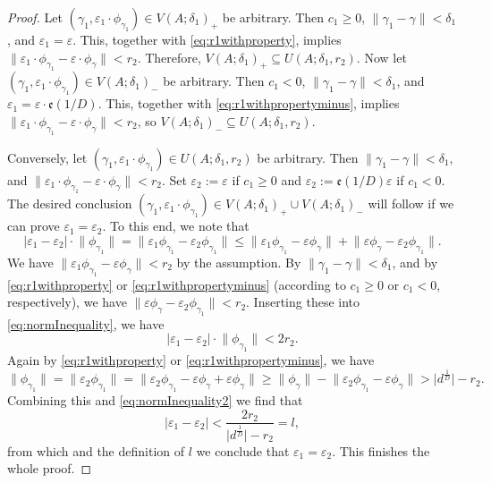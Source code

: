 \documentclass[12pt]{amsart}
\numberwithin{equation}{section}
\theoremstyle{plain}
\theoremstyle{definition}
\theoremstyle{remark}
\newcommand*\abs[1]{\lvert#1\rvert}
\newcommand\etp[1]{\mathfrak{e}\left(#1\right)}
\begin{document}
\begin{appendix}
\begin{proof}
Let $(\gamma_1,\varepsilon_1\cdot\phi_{\gamma_1})\in V(A;\delta_1)_{+}$ be arbitrary. Then $c_1\geq0$, $\lVert\gamma_1-\gamma\rVert<\delta_1$, and $\varepsilon_1=\varepsilon$. This, together with \eqref{eq:r1withproperty}, implies $\lVert\varepsilon_1\cdot\phi_{\gamma_1}-\varepsilon\cdot\phi_{\gamma}\rVert<r_2$. Therefore, $V(A;\delta_1)_{+}\subseteq U(A;\delta_1,r_2)$. Now let $(\gamma_1,\varepsilon_1\cdot\phi_{\gamma_1})\in V(A;\delta_1)_{-}$ be arbitrary. Then $c_1<0$, $\lVert\gamma_1-\gamma\rVert<\delta_1$, and $\varepsilon_1=\varepsilon\cdot\etp{1/D}$. This, together with \eqref{eq:r1withpropertyminus}, implies $\lVert\varepsilon_1\cdot\phi_{\gamma_1}-\varepsilon\cdot\phi_{\gamma}\rVert<r_2$, so $V(A;\delta_1)_{-}\subseteq U(A;\delta_1,r_2)$.

Conversely, let $(\gamma_1,\varepsilon_1\cdot\phi_{\gamma_1})\in U(A;\delta_1,r_2)$ be arbitrary. Then $\lVert\gamma_1-\gamma\rVert<\delta_1$, and $\lVert\varepsilon_1\cdot\phi_{\gamma_1}-\varepsilon\cdot\phi_{\gamma}\rVert<r_2$. Set $\varepsilon_2:=\varepsilon$ if $c_1\geq0$ and $\varepsilon_2:=\etp{1/D}\varepsilon$ if $c_1<0$. The desired conclusion $(\gamma_1,\varepsilon_1\cdot\phi_{\gamma_1})\in V(A;\delta_1)_{+}\cup V(A;\delta_1)_{-}$ will follow if we can prove $\varepsilon_1=\varepsilon_2$. To this end, we note that
\begin{equation}
\label{eq:normInequality}
\abs{\varepsilon_1-\varepsilon_2}\cdot\lVert\phi_{\gamma_1}\rVert=\lVert\varepsilon_1\phi_{\gamma_1}-\varepsilon_2\phi_{\gamma_1}\rVert\leq\lVert\varepsilon_1\phi_{\gamma_1}-\varepsilon\phi_{\gamma}\rVert+\lVert\varepsilon\phi_{\gamma}-\varepsilon_2\phi_{\gamma_1}\rVert.
\end{equation}
We have $\lVert\varepsilon_1\phi_{\gamma_1}-\varepsilon\phi_{\gamma}\rVert<r_2$ by the assumption. By $\lVert\gamma_1-\gamma\rVert<\delta_1$, and by \eqref{eq:r1withproperty} or \eqref{eq:r1withpropertyminus} (according to $c_1\geq0$ or $c_1<0$, respectively), we have $\lVert\varepsilon\phi_{\gamma}-\varepsilon_2\phi_{\gamma_1}\rVert<r_2$. Inserting these into \eqref{eq:normInequality}, we have
\begin{equation}
\label{eq:normInequality2}
\abs{\varepsilon_1-\varepsilon_2}\cdot\lVert\phi_{\gamma_1}\rVert<2r_2.
\end{equation}
Again by \eqref{eq:r1withproperty} or \eqref{eq:r1withpropertyminus}, we have
$$\lVert\phi_{\gamma_1}\rVert=\lVert\varepsilon_2\phi_{\gamma_1}\rVert=\lVert\varepsilon_2\phi_{\gamma_1}-\varepsilon\phi_\gamma+\varepsilon\phi_\gamma\rVert\geq\lVert\phi_\gamma\rVert-\lVert\varepsilon_2\phi_{\gamma_1}-\varepsilon\phi_\gamma\rVert>\abs{d^{\frac{1}{D}}}-r_2.$$
Combining this and \eqref{eq:normInequality2} we find that
\begin{equation}
\label{eq:normInequality3}
\abs{\varepsilon_1-\varepsilon_2}<\frac{2r_2}{\abs{d^{\frac{1}{D}}}-r_2}=l,
\end{equation}
from which and the definition of $l$ we conclude that $\varepsilon_1=\varepsilon_2$. This finishes the whole proof.
\end{proof}


\end{appendix}
\end{document}
